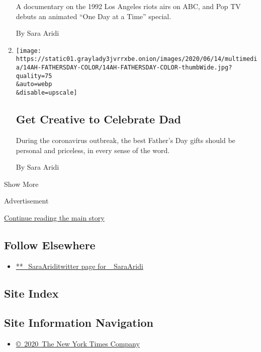 \begin{enumerate}
  A documentary on the 1992 Los Angeles riots airs on ABC, and Pop TV
  debuts an animated ``One Day at a Time'' special.

  By Sara Aridi
\item
  \href{/2020/06/13/at-home/fathers-day-gifts-coronavirus.html}{}

  \texttt{[image: https://static01.graylady3jvrrxbe.onion/images/2020/06/14/multimedia/14AH-FATHERSDAY-COLOR/14AH-FATHERSDAY-COLOR-thumbWide.jpg?quality=75\\\&auto=webp\\\&disable=upscale]}

  \hypertarget{get-creative-to-celebrate-dad}{%
  \subsection{Get Creative to Celebrate
  Dad}\label{get-creative-to-celebrate-dad}}

  During the coronavirus outbreak, the best Father's Day gifts should be
  personal and priceless, in every sense of the word.

  By Sara Aridi
\end{enumerate}

Show More

Advertisement

\protect\hyperlink{after-mid2}{Continue reading the main story}

\hypertarget{follow-elsewhere}{%
\subsection{Follow Elsewhere}\label{follow-elsewhere}}

\begin{itemize}
\tightlist
\item
  \href{https://twitter.com/_SaraAridi}{**\_SaraAriditwitter page for
  \_SaraAridi}
\end{itemize}

\hypertarget{site-index}{%
\subsection{Site Index}\label{site-index}}

\hypertarget{site-information-navigation}{%
\subsection{Site Information
Navigation}\label{site-information-navigation}}

\begin{itemize}
\tightlist
\item
  \href{https://help.nytimes3xbfgragh.onion/hc/en-us/articles/115014792127-Copyright-notice}{©~2020~The
  New York Times Company}
\end{itemize}

